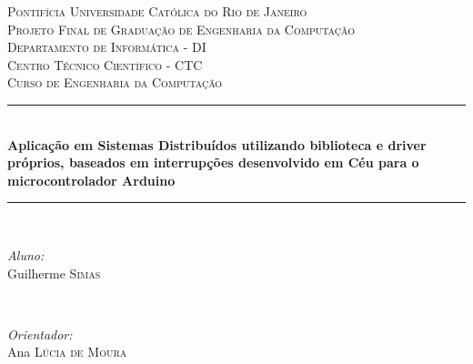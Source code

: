 \documentclass{article}
\begin{document}
\begin{titlepage}

\newcommand{\HRule}{\rule{\linewidth}{0.5mm}} %

\center %
 

\textsc{\LARGE Pontifícia Universidade Católica do Rio de Janeiro}\\[1.5cm] %
\textsc{\Large Projeto Final de Graduação de Engenharia da Computação}\\[0.5cm] %

\textsc{\large Departamento de Informática - DI \\ Centro Técnico Científico - CTC \\ Curso de Engenharia da Computação}\\[0.5cm] %



\HRule \\[0.4cm]
{ \huge \bfseries Aplicação em Sistemas Distribuídos
utilizando biblioteca e driver próprios,
baseados em interrupções desenvolvido
em Céu para o microcontrolador Arduino}\\[0.4cm] %
\HRule \\[1.5cm]
 

\begin{minipage}{0.4\textwidth}
\begin{flushleft} \large
\emph{Aluno:}\\
Guilherme \textsc{Simas} %
\end{flushleft}
\end{minipage}
~
\begin{minipage}{0.4\textwidth}
\begin{flushright} \large
\emph{Orientador:} \\
Ana \textsc{Lúcia de Moura} %
\end{flushright}
\end{minipage}\\[4cm]


\end{titlepage}
\end{document}
